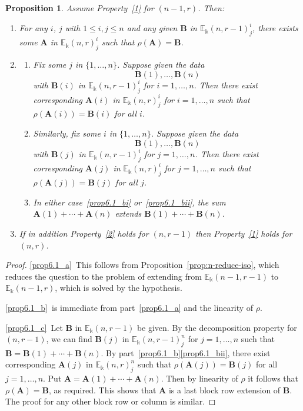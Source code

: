 \documentclass[10pt]{article}
\newtheorem{prop}[theorem]{Proposition}
\theoremstyle{definition}
\newcommand{\E}{\mathbb{E}}
\newcommand{\bA}{\mathbf{A}}
\newcommand{\bB}{\mathbf{B}}
\begin{document}
\begin{prop}\label{prop:extend}
Assume Property~\ref{1} for $(n-1,r)$. Then:
\begin{enumerate}[label=(\alph*)]
\item\label{prop6.1_a} For any $i$, $j$ with $1 \le i,j \le n$ and any given $\bB$ in
 $\E_\Bbbk(n,r-1)^i_j$, there exists some $\bA$ in
 $\E_\Bbbk(n,r)^i_j$ such that $\rho(\bA) = \bB$.

\item\label{prop6.1_b} 
 \begin{enumerate}[label=(\roman*)]
 \item\label{prop6.1_bi} Fix some $j$ in $\{1, \dots, n\}$. Suppose given
 the data
 \[\bB(1), \dots, \bB(n)\] with $\bB(i)$ in
 $\E_\Bbbk(n,r-1)^i_j$ for $i = 1, \dots, n$. Then there exist
 corresponding $\bA(i)$ in $\E_\Bbbk(n,r)^i_j$ for $i = 1, \dots, n$
 such that $\rho(\bA(i)) = \bB(i)$ for all $i$. 

 \item\label{prop6.1_bii} Similarly, fix some $i$ in $\{1, \dots, n\}$. Suppose
 given the data
 \[\bB(1), \dots, \bB(n)\] with 
 $\bB(j)$ in
 $\E_\Bbbk(n,r-1)^i_j$ for $j = 1, \dots, n$. Then there exist
 corresponding $\bA(j)$ in $\E_\Bbbk(n,r)^i_j$ for $j = 1, \dots, n$
 such that $\rho(\bA(j)) = \bB(j)$ for all $j$. 

 \item\label{prop6.1_biii} In either case~\ref{prop6.1_bi} or~\ref{prop6.1_bii}, the sum $\bA(1)
 + \cdots + \bA(n)$ extends $\bB(1) + \cdots + \bB(n)$.
 \end{enumerate}
 
\item\label{prop6.1_c} If in addition Property~\ref{2} holds for $(n,r-1)$ then
 Property~\ref{1} holds for $(n,r)$.
\end{enumerate}
\end{prop}

\begin{proof}
\ref{prop6.1_a}~This follows from Proposition~\ref{prop:n-reduce-iso}, which
 reduces the question to the problem of extending from
 $\E_\Bbbk(n-1,r-1)$ to $\E_\Bbbk(n-1,r)$, which is solved by the
 hypothesis.

\ref{prop6.1_b}~is immediate from part~\ref{prop6.1_a} and the linearity of $\rho$.

\ref{prop6.1_c}~Let $\bB$ in $\E_\Bbbk(n,r-1)$ be given. By the decomposition
 property for $(n,r-1)$, we can find $\bB(j)$ in
 $\E_\Bbbk(n,r-1)^n_j$ for $j = 1, \dots, n$ such that $\bB = \bB(1)
 + \cdots + \bB(n)$. By part~\ref{prop6.1_b}\ref{prop6.1_bii}, there exist corresponding
 $\bA(j)$ in $\E_\Bbbk(n,r)^n_j$ such that $\rho(\bA(j)) = \bB(j)$
 for all $j = 1, \dots, n$. Put $\bA = \bA(1) + \cdots +
 \bA(n)$. Then by linearity of $\rho$ it follows that $\rho(\bA) =
 \bB$, as required. This shows that $\bA$ is a last block row
 extension of $\bB$. The proof for any other block row or column is
 similar.
\end{proof}
\end{document}
